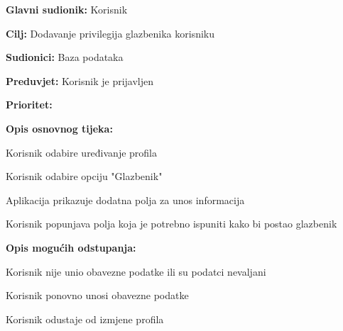 \noindent {}
	\begin{packed_item}
		
		\item \textbf{Glavni sudionik: } Korisnik
		\item  \textbf{Cilj:} Dodavanje privilegija glazbenika korisniku
		\item  \textbf{Sudionici:} Baza podataka
		\item  \textbf{Preduvjet:} Korisnik je prijavljen
		\item  \textbf{Prioritet:} 
		\item  \textbf{Opis osnovnog tijeka:} 
		
		\item[] \begin{packed_enum}
			
			\item Korisnik odabire uređivanje profila
			\item Korisnik odabire opciju "Glazbenik"
			\item Aplikacija prikazuje dodatna polja za unos informacija
			\item Korisnik popunjava polja koja je potrebno ispuniti kako bi postao glazbenik
	
		\end{packed_enum}
		\item  \textbf{Opis mogućih odstupanja:}
	
		\item[] \begin{packed_item}
			
			\item[4.a] Korisnik nije unio obavezne podatke ili su podatci nevaljani
			\item[] \begin{packed_enum}
				
				\item Korisnik ponovno unosi obavezne podatke
				\item Korisnik odustaje od izmjene profila
				
			\end{packed_enum}
		\end{packed_item}
	\end{packed_item}	
		
